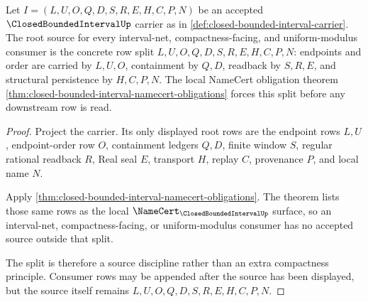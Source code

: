 \begin{theorem}
\label{thm:closed-bounded-interval-root-source-split}
Let $I=(L,U,O,Q,D,S,R,E,H,C,P,N)$ be an accepted $\ClosedBoundedIntervalUp$ carrier as in \autoref{def:closed-bounded-interval-carrier}. The root source for every interval-net, compactness-facing, and uniform-modulus consumer is the concrete row split $L,U,O,Q,D,S,R,E,H,C,P,N$: endpoints and order are carried by $L,U,O$, containment by $Q,D$, readback by $S,R,E$, and structural persistence by $H,C,P,N$. The local NameCert obligation theorem \autoref{thm:closed-bounded-interval-namecert-obligations} forces this split before any downstream row is read.
\end{theorem}
\begin{proof}
Project the carrier. Its only displayed root rows are the endpoint rows $L,U$, endpoint-order row $O$, containment ledgers $Q,D$, finite window $S$, regular rational readback $R$, Real seal $E$, transport $H$, replay $C$, provenance $P$, and local name $N$.

Apply \autoref{thm:closed-bounded-interval-namecert-obligations}. The theorem lists those same rows as the local $\NameCert_{\ClosedBoundedIntervalUp}$ surface, so an interval-net, compactness-facing, or uniform-modulus consumer has no accepted source outside that split.

The split is therefore a source discipline rather than an extra compactness principle. Consumer rows may be appended after the source has been displayed, but the source itself remains $L,U,O,Q,D,S,R,E,H,C,P,N$.
\end{proof}

